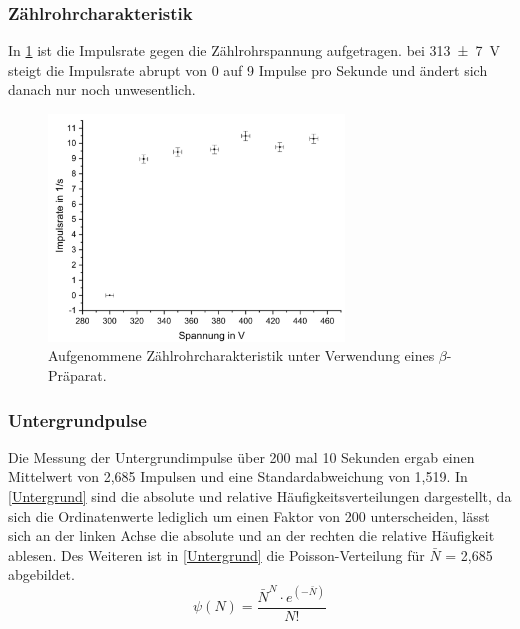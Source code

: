 \documentclass[
	a4paper,
	12pt,
	pagesize,
	ngerman
]{scrartcl}
\begin{document}
	\subsubsection{Zählrohrcharakteristik}
	In \cref{Zaehlrohrcharakteristik} ist die Impulsrate gegen die Zählrohrspannung aufgetragen.
	bei \SI{313+-7}{\volt} steigt die Impulsrate abrupt von 0 auf 9 Impulse pro Sekunde und ändert sich danach nur noch unwesentlich. 
	
	
	\begin{figure}[H]
		\includegraphics[width=0.7\textwidth]{Zaehlrohrcharakteristik}
		\centering
		\caption{Aufgenommene Zählrohrcharakteristik unter Verwendung eines $\beta$-Präparat.}%
		\label{Zaehlrohrcharakteristik}
		\centering
	\end{figure}
	
	\subsubsection{Untergrundpulse}
	Die Messung der Untergrundimpulse über 200 mal 10 Sekunden ergab einen Mittelwert von 2,685 Impulsen und eine Standardabweichung von 1,519. 
	In \cref{Untergrund} sind die absolute und relative Häufigkeitsverteilungen dargestellt, da sich die Ordinatenwerte lediglich um einen Faktor von 200 unterscheiden, lässt sich an der linken Achse die absolute und an der rechten die relative Häufigkeit ablesen.
	Des Weiteren ist in \cref{Untergrund} die Poisson-Verteilung für $\bar{N}$ = 2,685 abgebildet.
	\begin{equation}
		\psi(N) = \frac{\bar{N}^N \cdot e^{(-\bar{N})}}{N!}
	\label{Poisson}
	\end{equation}
	
\end{document}
